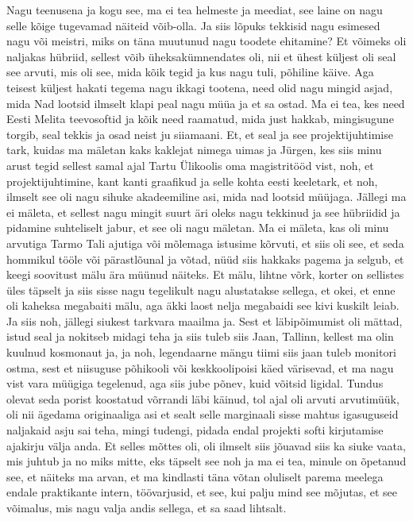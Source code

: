 Nagu teenusena ja kogu see, ma ei tea helmeste ja meediat, see laine on nagu selle kõige tugevamad näiteid võib-olla. Ja siis lõpuks tekkisid nagu esimesed nagu või meistri, miks on täna muutunud nagu toodete ehitamine? Et võimeks oli naljakas hübriid, sellest võib üheksakümnendates oli, nii et ühest küljest oli seal see arvuti, mis oli see, mida kõik tegid ja kus nagu tuli, põhiline käive. Aga teisest küljest hakati tegema nagu ikkagi tootena, need olid nagu mingid asjad, mida Nad lootsid ilmselt klapi peal nagu müüa ja et sa ostad. Ma ei tea, kes need Eesti Melita teevosoftid ja kõik need raamatud, mida just hakkab, mingisugune torgib, seal tekkis ja osad neist ju siiamaani. Et, et seal ja see projektijuhtimise tark, kuidas ma mäletan kaks kaklejat nimega uimas ja Jürgen, kes siis minu arust tegid sellest samal ajal Tartu Ülikoolis oma magistritööd vist, noh, et projektijuhtimine, kant kanti graafikud ja selle kohta eesti keeletark, et noh, ilmselt see oli nagu sihuke akadeemiline asi, mida nad lootsid müüjaga. Jällegi ma ei mäleta, et sellest nagu mingit suurt äri oleks nagu tekkinud ja see hübriidid ja pidamine suhteliselt jabur, et see oli nagu mäletan. Ma ei mäleta, kas oli minu arvutiga Tarmo Tali ajutiga või mõlemaga istusime kõrvuti, et siis oli see, et seda hommikul tööle või pärastlõunal ja võtad, nüüd siis hakkaks pagema ja selgub, et keegi soovitust mälu ära müünud näiteks. Et mälu, lihtne võrk, korter on sellistes üles täpselt ja siis sisse nagu tegelikult nagu alustatakse sellega, et okei, et enne oli kaheksa megabaiti mälu, aga äkki laost nelja megabaidi see kivi kuskilt leiab. Ja siis noh, jällegi siukest tarkvara maailma ja. Sest et läbipõimumist oli mättad, istud seal ja nokitseb midagi teha ja siis tuleb siis Jaan, Tallinn, kellest ma olin kuulnud kosmonaut ja, ja noh, legendaarne mängu tiimi siis jaan tuleb monitori ostma, sest et niisuguse põhikooli või keskkoolipoisi käed värisevad, et ma nagu vist vara müügiga tegelenud, aga siis jube põnev, kuid võitsid ligidal. Tundus olevat seda porist koostatud võrrandi läbi käinud, tol ajal oli arvuti arvutimüük, oli nii ägedama originaaliga asi et sealt selle marginaali sisse mahtus igasuguseid naljakaid asju sai teha, mingi tudengi, pidada endal projekti softi kirjutamise ajakirju välja anda. Et selles mõttes oli, oli ilmselt siis jõuavad siis ka siuke vaata, mis juhtub ja no miks mitte, eks täpselt see noh ja ma ei tea, minule on õpetanud see, et näiteks ma arvan, et ma kindlasti täna võtan oluliselt parema meelega endale praktikante intern, töövarjusid, et see, kui palju mind see mõjutas, et see võimalus, mis nagu valja andis sellega, et sa saad lihtsalt.
